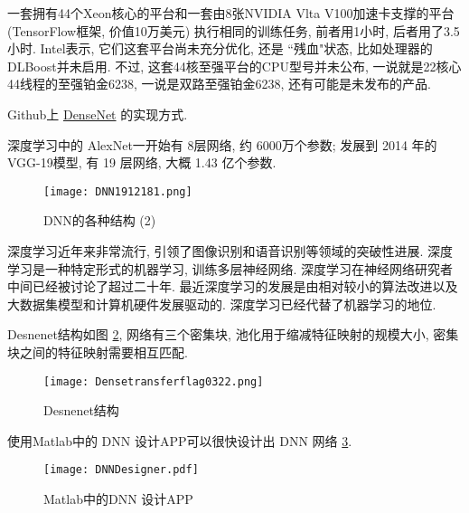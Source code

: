 \begin{exampleT}
    一套拥有44个Xeon核心的平台和一套由8张NVIDIA Vlta V100加速卡支撑的平台 (TensorFlow框架, 价值10万美元) 执行相同的训练任务, 前者用1小时, 后者用了3.5小时.
Intel表示, 它们这套平台尚未充分优化, 还是 ``残血"状态, 比如处理器的DLBoost并未启用.
不过, 这套44核至强平台的CPU型号并未公布, 一说就是22核心44线程的至强铂金6238, 一说是双路至强铂金6238, 还有可能是未发布的产品.
\end{exampleT}
\begin{exampleT}
    Github上 \href{https://github.com/zggl/DenseNet}{DenseNet} 的实现方式.
\end{exampleT}
\begin{example}
    深度学习中的 AlexNet一开始有 8层网络, 约 6000万个参数; 发展到 2014 年的 VGG-19模型, 有 19 层网络, 大概 1.43 亿个参数.
\end{example}
\begin{figure}[H]
    \centering
    \texttt{[image: DNN1912181.png]}
    \caption{DNN的各种结构 (2)}
    \label{DNN191218121500011}
    \vspace{-0.4cm}
\end{figure}
深度学习近年来非常流行, 引领了图像识别和语音识别等领域的突破性进展.
深度学习是一种特定形式的机器学习, 训练多层神经网络.
深度学习在神经网络研究者中间已经被讨论了超过二十年.
最近深度学习的发展是由相对较小的算法改进以及大数据集模型和计算机硬件发展驱动的.
深度学习已经代替了机器学习的地位.

Desnenet结构如图 \ref{Densetransferflag03220304}, 网络有三个密集块, 池化用于缩减特征映射的规模大小, 密集块之间的特征映射需要相互匹配.
\begin{figure}[H]
    \centering
    \texttt{[image: Densetransferflag0322.png]}
    \caption{Desnenet结构}
    \label{Densetransferflag03220304}
\end{figure}

使用Matlab中的 DNN 设计APP可以很快设计出 DNN 网络 \ref{DNNDesigner20200304}.
\begin{figure}[H]
    \centering
    \texttt{[image: DNNDesigner.pdf]}
    \caption{Matlab中的DNN 设计APP}
    \label{DNNDesigner20200304}
\end{figure}
